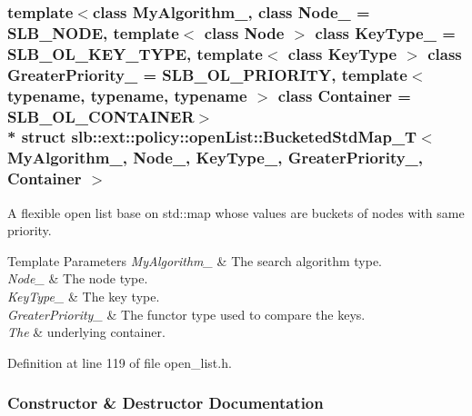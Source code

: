 \subsubsection*{template$<$class My\+Algorithm\+\_\+, class Node\+\_\+ = S\+L\+B\+\_\+\+N\+O\+DE, template$<$ class Node $>$ class Key\+Type\+\_\+ = S\+L\+B\+\_\+\+O\+L\+\_\+\+K\+E\+Y\+\_\+\+T\+Y\+PE, template$<$ class Key\+Type $>$ class Greater\+Priority\+\_\+ = S\+L\+B\+\_\+\+O\+L\+\_\+\+P\+R\+I\+O\+R\+I\+TY, template$<$ typename, typename, typename $>$ class Container = S\+L\+B\+\_\+\+O\+L\+\_\+\+C\+O\+N\+T\+A\+I\+N\+ER$>$\\*
struct slb\+::ext\+::policy\+::open\+List\+::\+Bucketed\+Std\+Map\+\_\+\+T$<$ My\+Algorithm\+\_\+, Node\+\_\+, Key\+Type\+\_\+, Greater\+Priority\+\_\+, Container $>$}

A flexible open list base on {\ttfamily std\+::map} whose values are buckets of nodes with same priority. 


\begin{DoxyTemplParams}{Template Parameters}
{\em My\+Algorithm\+\_\+} & The search algorithm type. \\
\hline
{\em Node\+\_\+} & The node type. \\
\hline
{\em Key\+Type\+\_\+} & The key type. \\
\hline
{\em Greater\+Priority\+\_\+} & The functor type used to compare the keys. \\
\hline
{\em The} & underlying container. \\
\hline
\end{DoxyTemplParams}


Definition at line 119 of file open\+\_\+list.\+h.



\subsubsection{Constructor \& Destructor Documentation}
